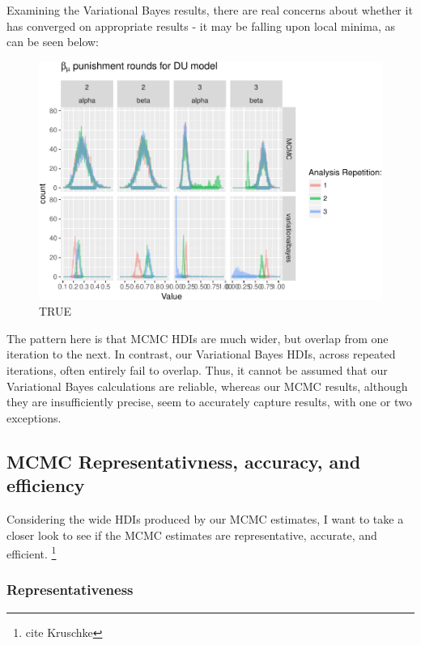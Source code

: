 \documentclass[]{article}
\let\rmarkdownfootnote\footnote%
\def\footnote{\protect\rmarkdownfootnote}
\begin{document}
Examining the Variational Bayes results, there are real concerns about
whether it has converged on appropriate results - it may be falling upon
local minima, as can be seen below:

\begin{figure}[htbp]
\centering
\includegraphics{compare_vb_and_MCMC_doubleUpdateOnly_files/figure-latex/CompareVBvsMCMCReliability2-1.pdf}
\caption{TRUE}
\end{figure}

The pattern here is that MCMC HDIs are much wider, but overlap from one
iteration to the next. In contrast, our Variational Bayes HDIs, across
repeated iterations, often entirely fail to overlap. Thus, it cannot be
assumed that our Variational Bayes calculations are reliable, whereas
our MCMC results, although they are insufficiently precise, seem to
accurately capture results, with one or two exceptions.

\subsection{MCMC Representativness, accuracy, and
efficiency}\label{mcmc-representativness-accuracy-and-efficiency}

Considering the wide HDIs produced by our MCMC estimates, I want to take
a closer look to see if the MCMC estimates are representative, accurate,
and efficient. \footnote{cite Kruschke}

\subsubsection{Representativeness}\label{representativeness}
\end{document}
